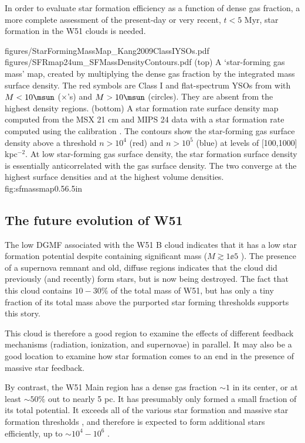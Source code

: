 In order to evaluate star formation efficiency as a
function of dense gas fraction, a more complete assessment of the present-day
or very recent, $t<5$ Myr, star formation in the W51 clouds is needed.

\FigureTwoAA
{figures/StarFormingMassMap_Kang2009ClassIYSOs.pdf}
{figures/SFRmap24um_SFMassDensityContours.pdf}
{(top) A `star-forming gas mass' map, created by multiplying the dense gas
fraction by the integrated \thirteenco mass surface density.  The red
symbols are Class I and flat-spectrum YSOs from \citet{Kang2009a} with
$M<10 \msun$ ($\times$'s) and $M>10 \msun$ (circles).  They are
absent from the highest density regions.
(bottom) A star formation rate surface density map computed from the MSX
21 cm and MIPS 24 \um \citep{Price2001a,Carey2009a} data with a star formation
rate computed using the \citet{Rieke2009a} calibration \citep{Kennicutt2012a}.
The contours show the star-forming gas surface density above a threshold
$n>10^4$ \percc (red) and $n>10^5$ \percc (blue) at levels of [100,1000] \msun
kpc$^{-2}$.  At low star-forming gas surface density,
the star formation surface density is essentially anticorrelated with the gas
surface density.  The two converge at the highest surface densities and at the highest
volume densities.
}
{fig:sfmassmap}{0.5}{6.5in}

\subsection{The future evolution of W51}
\label{sec:futureev}
The low DGMF associated with the W51 B cloud indicates that it has a
low star formation potential despite containing significant mass
($M\gtrsim1\ee{5}$ \msun).  The presence of a supernova remnant and old,
diffuse \hii regions indicates that the cloud did previously (and recently) form
stars, but is now being destroyed.  The fact that this cloud contains $10-30\%$
of the total mass of W51, but has only a tiny fraction of its total mass above
the purported star forming thresholds supports this story.

This cloud is therefore a good region to examine the effects of different
feedback mechanisms (radiation, ionization, and supernovae) in parallel.  It
may also be a good location to examine how star formation comes to an end in
the presence of massive star feedback.

By contrast, the W51 Main region has a dense gas fraction $\sim1$ in its
center, or at least $\sim50\%$ out to nearly 5 pc.  It has presumably only
formed a small fraction
of its total potential.  It exceeds all of the various star formation and
massive star formation thresholds
\citep[e.g.][]{Lada2010a,Krumholz2008a,Kauffmann2010a}, and therefore is
expected to form additional stars efficiently, up to $\sim10^4-10^6$
\msun.

